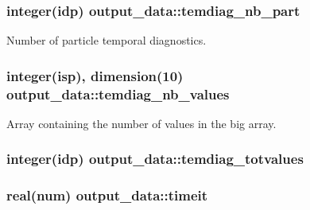 \subsubsection[{\texorpdfstring{temdiag\+\_\+nb\+\_\+part}{temdiag_nb_part}}]{\setlength{\rightskip}{0pt plus 5cm}integer(idp) output\+\_\+data\+::temdiag\+\_\+nb\+\_\+part}\hypertarget{namespaceoutput__data_a950d70a052698f77988f39da1fddf632}{}\label{namespaceoutput__data_a950d70a052698f77988f39da1fddf632}


Number of particle temporal diagnostics. 

\subsubsection[{\texorpdfstring{temdiag\+\_\+nb\+\_\+values}{temdiag_nb_values}}]{\setlength{\rightskip}{0pt plus 5cm}integer(isp), dimension(10) output\+\_\+data\+::temdiag\+\_\+nb\+\_\+values}\hypertarget{namespaceoutput__data_a2c62698838d0295802c6b2a6637c3827}{}\label{namespaceoutput__data_a2c62698838d0295802c6b2a6637c3827}


Array containing the number of values in the big array. 

\subsubsection[{\texorpdfstring{temdiag\+\_\+totvalues}{temdiag_totvalues}}]{\setlength{\rightskip}{0pt plus 5cm}integer(idp) output\+\_\+data\+::temdiag\+\_\+totvalues}\hypertarget{namespaceoutput__data_a85fe1c4047057dc4292320e82cae2cda}{}\label{namespaceoutput__data_a85fe1c4047057dc4292320e82cae2cda}
\subsubsection[{\texorpdfstring{timeit}{timeit}}]{\setlength{\rightskip}{0pt plus 5cm}real(num) output\+\_\+data\+::timeit}\hypertarget{namespaceoutput__data_adee8dc0fd9ff0328c325cfc24be39db3}{}\label{namespaceoutput__data_adee8dc0fd9ff0328c325cfc24be39db3}
